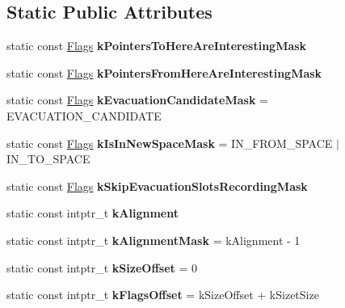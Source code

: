 \subsection*{Static Public Attributes}
\begin{DoxyCompactItemize}
\item 
static const \mbox{\hyperlink{classuintptr__t}{Flags}} {\bfseries k\+Pointers\+To\+Here\+Are\+Interesting\+Mask}
\item 
static const \mbox{\hyperlink{classuintptr__t}{Flags}} {\bfseries k\+Pointers\+From\+Here\+Are\+Interesting\+Mask}
\item 
\mbox{\label{classv8_1_1internal_1_1MemoryChunk_a53db059f478c46cfffd28c0370c23dc3}} 
static const \mbox{\hyperlink{classuintptr__t}{Flags}} {\bfseries k\+Evacuation\+Candidate\+Mask} = E\+V\+A\+C\+U\+A\+T\+I\+O\+N\+\_\+\+C\+A\+N\+D\+I\+D\+A\+TE
\item 
\mbox{\label{classv8_1_1internal_1_1MemoryChunk_ae29fb5f088e77f1d3ba749745a8517ed}} 
static const \mbox{\hyperlink{classuintptr__t}{Flags}} {\bfseries k\+Is\+In\+New\+Space\+Mask} = I\+N\+\_\+\+F\+R\+O\+M\+\_\+\+S\+P\+A\+CE $\vert$ I\+N\+\_\+\+T\+O\+\_\+\+S\+P\+A\+CE
\item 
static const \mbox{\hyperlink{classuintptr__t}{Flags}} {\bfseries k\+Skip\+Evacuation\+Slots\+Recording\+Mask}
\item 
static const intptr\+\_\+t {\bfseries k\+Alignment}
\item 
\mbox{\label{classv8_1_1internal_1_1MemoryChunk_aacbc80f7e6ca4f243c9b31dc2d5fd6e8}} 
static const intptr\+\_\+t {\bfseries k\+Alignment\+Mask} = k\+Alignment -\/ 1
\item 
\mbox{\label{classv8_1_1internal_1_1MemoryChunk_a92f3178835a10fa2ad862528a91f1e66}} 
static const intptr\+\_\+t {\bfseries k\+Size\+Offset} = 0
\item 
\mbox{\label{classv8_1_1internal_1_1MemoryChunk_ad9720790421c6b7c580b9296f75dadc1}} 
static const intptr\+\_\+t {\bfseries k\+Flags\+Offset} = k\+Size\+Offset + k\+Sizet\+Size
\item 
\mbox{\label{classv8_1_1internal_1_1MemoryChunk_a3d5c543999d52684797a531411256f8e}} 

\end{DoxyCompactItemize}
